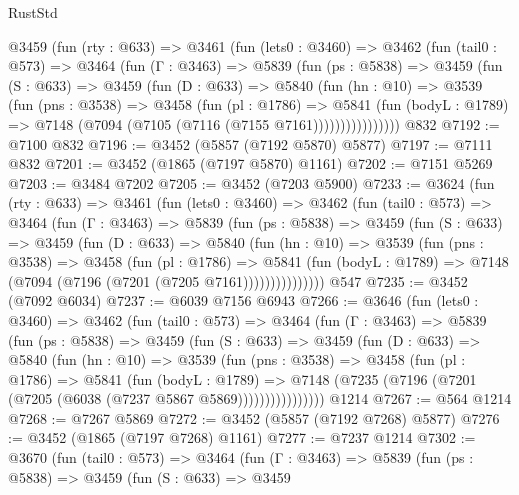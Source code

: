 \begin{lexlean}{RustStd}
\begin{coremodule}
    @3459
      (fun (rty : @633) =>
      @3461
        (fun (lets0 : @3460) =>
        @3462
          (fun (tail0 : @573) =>
          @3464
            (fun (Γ : @3463) =>
            @5839
              (fun (ps : @5838) =>
              @3459
                (fun (S : @633) =>
                @3459
                  (fun (D : @633) =>
                  @5840
                    (fun (hn : @10) =>
                    @3539
                      (fun (pns : @3538) =>
                      @3458
                        (fun (pl : @1786) =>
                        @5841
                          (fun (bodyL : @1789) =>
                          @7148 (@7094 (@7105 (@7116 (@7155 @7161))))))))))))))))
    @832
@7192 := @7100 @832
@7196 := @3452 (@5857 (@7192 @5870) @5877)
@7197 := @7111 @832
@7201 := @3452 (@1865 (@7197 @5870) @1161)
@7202 := @7151 @5269
@7203 := @3484 @7202
@7205 := @3452 (@7203 @5900)
@7233 := @3624
    (fun (rty : @633) =>
    @3461
      (fun (lets0 : @3460) =>
      @3462
        (fun (tail0 : @573) =>
        @3464
          (fun (Γ : @3463) =>
          @5839
            (fun (ps : @5838) =>
            @3459
              (fun (S : @633) =>
              @3459
                (fun (D : @633) =>
                @5840
                  (fun (hn : @10) =>
                  @3539
                    (fun (pns : @3538) =>
                    @3458
                      (fun (pl : @1786) =>
                      @5841
                        (fun (bodyL : @1789) =>
                        @7148 (@7094 (@7196 (@7201 (@7205 @7161)))))))))))))))
    @547
@7235 := @3452 (@7092 @6034)
@7237 := @6039 @7156 @6943
@7266 := @3646
    (fun (lets0 : @3460) =>
    @3462
      (fun (tail0 : @573) =>
      @3464
        (fun (Γ : @3463) =>
        @5839
          (fun (ps : @5838) =>
          @3459
            (fun (S : @633) =>
            @3459
              (fun (D : @633) =>
              @5840
                (fun (hn : @10) =>
                @3539
                  (fun (pns : @3538) =>
                  @3458
                    (fun (pl : @1786) =>
                    @5841
                      (fun (bodyL : @1789) =>
                      @7148 (@7235 (@7196 (@7201 (@7205 (@6038 (@7237 @5867 @5869))))))))))))))))
    @1214
@7267 := @564 @1214
@7268 := @7267 @5869
@7272 := @3452 (@5857 (@7192 @7268) @5877)
@7276 := @3452 (@1865 (@7197 @7268) @1161)
@7277 := @7237 @1214
@7302 := @3670
    (fun (tail0 : @573) =>
    @3464
      (fun (Γ : @3463) =>
      @5839
        (fun (ps : @5838) =>
        @3459
          (fun (S : @633) =>
          @3459

\end{coremodule}
\end{lexlean}
